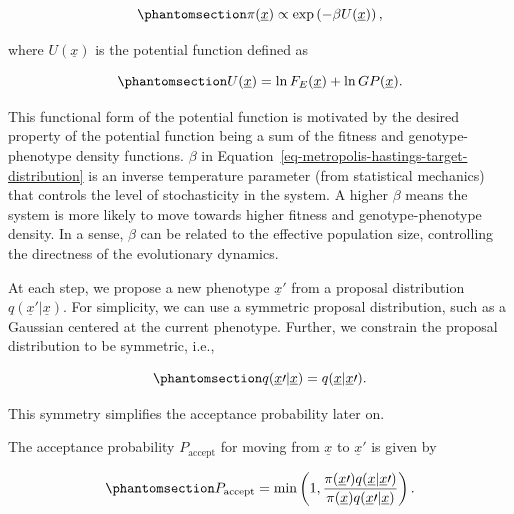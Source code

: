 \documentclass[
]{scrartcl}
\begin{document}
\begin{refsection}
\begin{equation}\phantomsection\label{eq-metropolis-hastings-target-distribution}{
\pi(\underline{x}) \propto \exp\left(
    -\beta U(\underline{x})
\right),
}\end{equation}

where \(U(\underline{x})\) is the potential function defined as

\begin{equation}\phantomsection\label{eq-metropolis-hastings-potential-function}{
U(\underline{x}) = \ln F_E(\underline{x}) + \ln GP(\underline{x}).
}\end{equation}

This functional form of the potential function is motivated by the
desired property of the potential function being a sum of the fitness
and genotype-phenotype density functions. \(\beta\) in
Equation~\ref{eq-metropolis-hastings-target-distribution} is an inverse
temperature parameter (from statistical mechanics) that controls the
level of stochasticity in the system. A higher \(\beta\) means the
system is more likely to move towards higher fitness and
genotype-phenotype density. In a sense, \(\beta\) can be related to the
effective population size, controlling the directness of the
evolutionary dynamics.

At each step, we propose a new phenotype \(\underline{x}{\prime}\) from
a proposal distribution \(q(\underline{x}{\prime} | \underline{x})\).
For simplicity, we can use a symmetric proposal distribution, such as a
Gaussian centered at the current phenotype. Further, we constrain the
proposal distribution to be symmetric, i.e.,

\begin{equation}\phantomsection\label{eq-metropolis-hastings-proposal-distribution-symmetry}{
q(\underline{x}{\prime} | \underline{x}) = 
q(\underline{x} | \underline{x}{\prime}).
}\end{equation}

This symmetry simplifies the acceptance probability later on.

The acceptance probability \(P_{\text{accept}}\) for moving from
\(\underline{x}\) to \(\underline{x}{\prime}\) is given by

\begin{equation}\phantomsection\label{eq-metropolis-hastings-acceptance-probability}{
P_{\text{accept}} = 
\min\left(1, 
    \frac{\pi(\underline{x}{\prime}) q(\underline{x} | \underline{x}{\prime})}
    {\pi(\underline{x}) q(\underline{x}{\prime} | \underline{x})}
\right).
}\end{equation}


\end{refsection}
\end{document}
